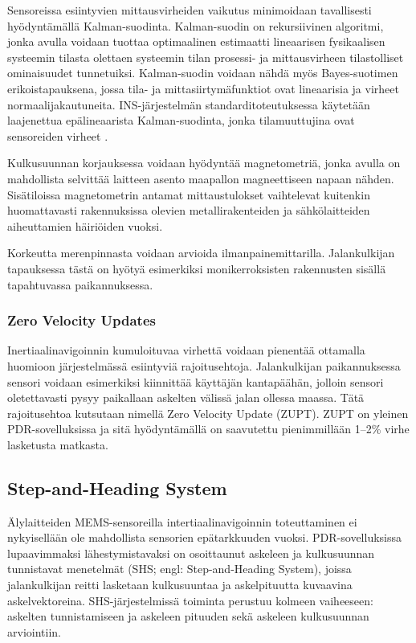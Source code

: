 Sensoreissa esiintyvien mittausvirheiden vaikutus minimoidaan tavallisesti
hyödyntämällä Kalman-suodinta.
Kalman-suodin on rekursiivinen algoritmi,
jonka avulla voidaan tuottaa optimaalinen estimaatti lineaarisen
fysikaalisen systeemin
tilasta olettaen systeemin tilan prosessi- ja mittausvirheen tilastolliset
ominaisuudet tunnetuiksi. Kalman-suodin voidaan nähdä myös Bayes-suotimen
erikoistapauksena,
jossa tila- ja mittasiirtymäfunktiot ovat lineaarisia ja virheet
normaalijakautuneita. INS-järjestelmän standarditoteutuksessa
käytetään laajenettua epälineaarista Kalman-suodinta, jonka tilamuuttujina
ovat sensoreiden virheet \cite{foxlin2005}.

Kulkusuunnan korjauksessa voidaan hyödyntää magnetometriä, jonka avulla on
mahdollista selvittää laitteen asento maapallon magneettiseen napaan nähden.
Sisätiloissa magnetometrin antamat mittaustulokset vaihtelevat kuitenkin
huomattavasti rakennuksissa olevien metallirakenteiden ja sähkölaitteiden
aiheuttamien häiriöiden vuoksi.

Korkeutta merenpinnasta voidaan arvioida ilmanpainemittarilla. Jalankulkijan
tapauksessa tästä on hyötyä esimerkiksi monikerroksisten rakennusten
sisällä tapahtuvassa paikannuksessa.

\subsubsection{Zero Velocity Updates}

Inertiaalinavigoinnin kumuloituvaa virhettä voidaan pienentää ottamalla
huomioon järjestelmässä esiintyviä rajoitusehtoja. Jalankulkijan paikannuksessa
sensori voidaan esimerkiksi kiinnittää käyttäjän kantapäähän, jolloin
sensori oletettavasti pysyy paikallaan askelten välissä jalan ollessa maassa.
Tätä rajoitusehtoa kutsutaan nimellä Zero Velocity Update (ZUPT).
ZUPT on yleinen PDR-sovelluksissa ja sitä hyödyntämällä on saavutettu
pienimmillään 1--2\% virhe lasketusta matkasta.

\subsection{Step-and-Heading System}

Älylaitteiden MEMS-sensoreilla intertiaalinavigoinnin toteuttaminen ei
nykyisellään ole mahdollista sensorien epätarkkuuden vuoksi.  PDR-sovelluksissa
lupaavimmaksi lähestymistavaksi on osoittaunut askeleen ja kulkusuunnan
tunnistavat menetelmät (SHS; engl: Step-and-Heading System), joissa
jalankulkijan reitti lasketaan kulkusuuntaa ja askelpituutta kuvaavina
askelvektoreina. SHS-järjestelmissä toiminta perustuu kolmeen vaiheeseen:
askelten tunnistamiseen ja askeleen pituuden sekä askeleen kulkusuunnan
arviointiin.

